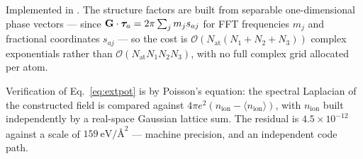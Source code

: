 \begin{ptip}
Implemented in . The structure factors
are built from separable one-dimensional phase vectors --- since
$\mathbf{G}\cdot\bm{\tau}_a = 2\pi\sum_j m_j s_{aj}$ for FFT frequencies $m_j$ and
fractional coordinates $s_{aj}$ --- so the cost is
$\mathcal{O}(N_{\mathrm{at}}(N_1{+}N_2{+}N_3))$ complex exponentials rather
than $\mathcal{O}(N_{\mathrm{at}}N_1N_2N_3)$, with no full complex grid
allocated per atom.
\end{ptip}

Verification of Eq.~\eqref{eq:extpot} is by Poisson's equation: the spectral
Laplacian of the constructed field is compared against
$4\pi e^2(n_{\mathrm{ion}}-\langle n_{\mathrm{ion}}\rangle)$, with
$n_{\mathrm{ion}}$ built independently by a real-space Gaussian lattice sum.
The residual is $4.5\times10^{-12}$ against a scale of $159\ \mathrm{eV}/\text{\AA}^2$
--- machine precision, and an independent code path.
